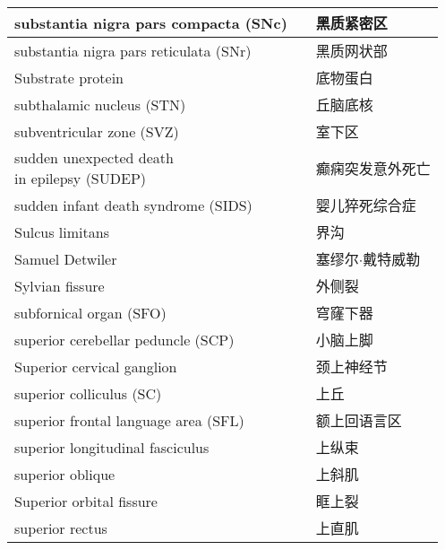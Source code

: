 \begin{longtable}{lll}
	\midrule
	substantia nigra pars compacta (SNc)  && 黑质紧密区 \\
	
	\midrule
	substantia nigra pars reticulata (SNr)  && 黑质网状部 \\
	
	\midrule
	Substrate protein  && 底物蛋白 \\
	
	\midrule
	subthalamic nucleus (STN)   && 丘脑底核 \\
	
	\midrule
	subventricular zone (SVZ)   && 室下区 \\
	
	\midrule
	\makecell[l]{sudden unexpected death \\in epilepsy (SUDEP)}  && 癫痫突发意外死亡 \\
	
	\midrule
	sudden infant death syndrome (SIDS)  && 婴儿猝死综合症 \\
	
	\midrule
	Sulcus limitans   && 界沟 \\
	
	\midrule
	Samuel Detwiler   && 塞缪尔$\cdot$戴特威勒 \\
	
	\midrule
	Sylvian fissure   && 外侧裂 \\
	
	\midrule
	subfornical organ (SFO)  && 穹窿下器 \\
	
	\midrule
	superior cerebellar peduncle (SCP)  && 小脑上脚 \\
	
	\midrule
	Superior cervical ganglion   && 颈上神经节 \\
	
	\midrule
	superior colliculus (SC)  && 上丘 \\
	
	\midrule
	superior frontal language area (SFL) && 额上回语言区 \\
	
	\midrule
	superior longitudinal fasciculus   && 上纵束 \\
	
	\midrule
	superior oblique   && 上斜肌 \\
	
	\midrule
	Superior orbital fissure   && 眶上裂 \\
	
	\midrule
	superior rectus   && 上直肌 \\
	

\end{longtable}
